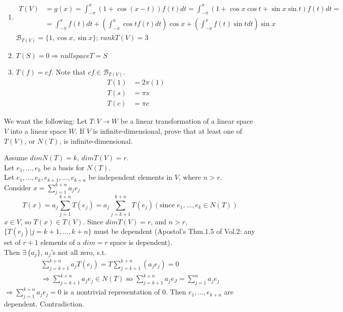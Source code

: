 \documentclass[twoside]{amsart}
\theoremstyle{plain}
\theoremstyle{definition}
\newcommand{\exercisehead}[1]
  {
   \noindent{\small\bf Exercise #1.}
   \smallskip}
\begin{document}
\begin{enumerate}
\item \[
\begin{aligned}
  T(V) & = g(x) = \int_{-\pi}^{\pi} (1+\cos{(x-t)})f(t) dt = \int_{-\pi}^{\pi} (1+\cos{x}\cos{t} + \sin{x}\sin{t})f(t) dt = \\
  & = \int_{-\pi}^{\pi} f(t) dt + \left( \int_{-\pi}^{\pi} \cos{t} f(t) dt \right) \cos{x} + \left( \int_{-\pi}^{\pi} f(t) \sin{t} dt \right) \sin{x} 
\end{aligned}
\]
$\mathcal{B}_{T(V)} = \{ 1, \cos{x}, \sin{x} \}$; \quad $rank{T(V)} = 3 $
\item $T(S) = 0 \Longrightarrow nullspace{T} = S$
\item $T(f) = cf$.  Note that $cf \in \mathcal{B}_{T(V)}$.  
\[
\boxed{
\begin{aligned}
  T(1) & = 2\pi (1) \\
  T(s) & = \pi s \\
  T(c) & = \pi c
\end{aligned}
}
\]
\end{enumerate}

\exercisehead{30} We want the following: Let $T: V\to W$ be a linear transformation of a linear space $V$ into a linear space $W$.  If $V$ is infinite-dimensional, prove that at least one of $T(V)$, or $N(T)$, is infinite-dimensional.  

Assume $dim{N(T)} = k, \, dim{T(V)} = r$.  \\
Let $e_1,\dots, e_k$ be a basis for $N(T)$.  \\
Let $e_1, \dots, e_k, e_{k+1}, \dots, e_{k+n}$ be independent elements in $V$, where $n>r$. \smallskip \\
Consider $x = \sum_{j=1}^{k+n} a_j e_j$
\[
T(x) = a_j \sum_{j=1}^{k+n} T(e_j) = a_j \sum_{j=k+1}^{k+n} T(e_j) (\text{since } e_1, \dots, e_k \in N(T) ) 
\]
$x\in V$, so $T(x) \in T(V)$.  Since $dim{T(V)} = r$, and $n>r$, $\{ T(e_j) | j = k+1, \dots, k+n \}$ must be dependent (Apostol's Thm.1.5 of Vol.2: any set of $r+1$ elements of a $dim = r$ space is dependent).  \smallskip \\
Then $\exists \, \{ a_j \}$, $a_j$'s not all zero, s.t. 
\[
\begin{gathered}
  \sum_{j=k+1}^{k+n} a_j T(e_j) = T \sum_{j=k+1}^{k+n} (a_j e_j) = 0 \\
 \Longrightarrow \sum_{j=k+1}^{k+n} a_j e_j \in N(T) \text{ so } \sum_{j=k+1}^{k+n} a_j e_J = \sum_{j=1}^n a_j e_j 
\end{gathered}
\]
 $\Longrightarrow \sum_{j=1}^{k+n} a_j e_j =0$ is a nontrivial representation of $0$.  Then $e_1, \dots, e_{k+n}$ are dependent.  Contradiction.  
\end{document}
